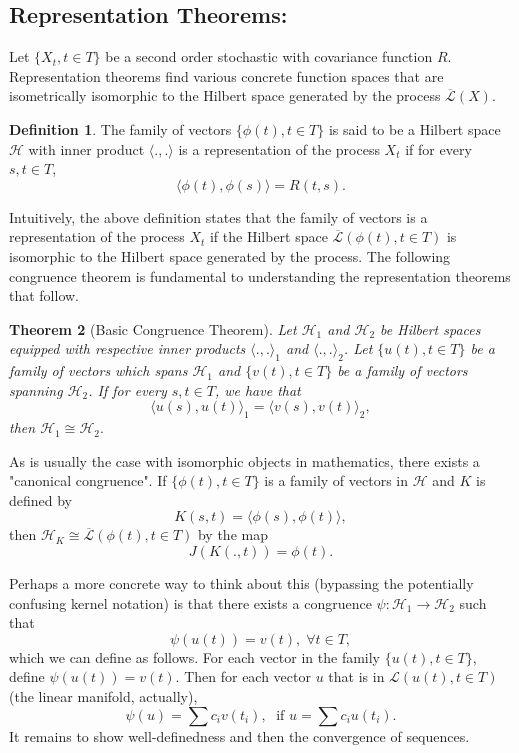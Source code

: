 \documentclass[psamsfonts]{amsart}
\newtheorem{thm}{Theorem}[section]
\theoremstyle{definition}
\newtheorem{defn}[thm]{Definition}
\theoremstyle{remark}
\numberwithin{equation}{section}
\begin{document}
\subsection{Representation Theorems:}
Let $\{ X_t, t \in T \}$ be a second order stochastic with covariance function $R$. Representation theorems find various concrete function spaces that are isometrically isomorphic to the Hilbert space generated by the process $\overline{\mathcal{L}}(X).$ 

\begin{defn}
The family of vectors $\{ \phi (t), t \in T \}$ is said to be a Hilbert space $\mathcal{H}$ with inner product $\langle . , . \rangle$ is a representation of the process $X_t$ if for every $s, t \in T$, 
$$\langle \phi (t) , \phi (s) \rangle = R(t, s). $$
\end{defn}

Intuitively, the above definition states that the family of vectors is a representation of the process $X_t$ if the Hilbert space $\overline{\mathcal{L}} (\phi (t), t \in T )$ is isomorphic to the Hilbert space generated by the process. The following congruence theorem is fundamental to understanding the representation theorems that follow. 

\begin{thm} [Basic Congruence Theorem]
Let $\mathcal{H} _1$ and $\mathcal{H} _2$ be Hilbert spaces equipped with respective inner products $\langle ., . \rangle _1$ and $\langle ., . \rangle _2$. Let $\{ u (t), t \in T \}$ be a family of vectors which spans $\mathcal{H} _1$ and $\{ v(t) , t \in T \}$ be a family of vectors spanning $\mathcal{H}_2$. If for every $s, t \in T$, we have that 
$$\langle u(s), u(t) \rangle _1 = \langle v(s), v(t) \rangle _2, $$
then $\mathcal{H}_1 \cong \mathcal{H}_2.$ 
\end{thm}

As is usually the case with isomorphic objects in mathematics, there exists a "canonical congruence". If $\{ \phi (t), t \in T \}$ is a family of vectors in $\mathcal{H}$ and $K$ is defined by 
$$K(s, t) = \langle \phi (s), \phi (t) \rangle, $$
then $\mathcal{H} _K \cong \overline{\mathcal{L}}(\phi (t), t \in T)$ by the map 
$$J(K(., t)) = \phi (t). $$

Perhaps a more concrete way to think about this (bypassing the potentially confusing kernel notation) is that there exists a congruence $\psi : \mathcal{H} _1 \rightarrow \mathcal{H} _2$ such that 
$$\psi (u(t)) = v(t), \; \forall t \in T, $$
which we can define as follows. For each vector in the family $\{ u(t), t \in T \}$, define $\psi (u(t)) = v(t).$ Then for each vector $u$ that is in $\mathcal{L} (u(t), t \in T)$ (the linear manifold, actually), 
$$\psi (u) = \sum c_i v(t_i), \; \text{ if } u = \sum c_i u(t_i). $$
It remains to show well-definedness and then the convergence of sequences. 
\end{document}
